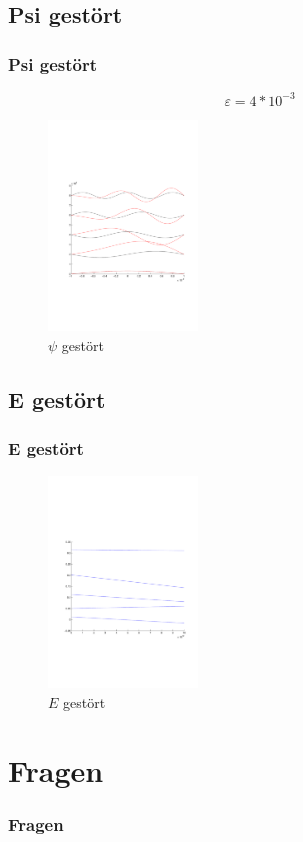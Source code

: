 \documentclass[aspectratio=169]{beamer}
\begin{document}
\subsection{ Psi gest\"ort }
\begin{frame}
  \frametitle{ Psi gest\"ort }
  \[
    \varepsilon = 4*10^{-3}
  \]
  \begin{figure}
    \centering
    \includegraphics[height=5.6cm,clip=true,trim=2cm 7cm 1cm 8cm]{../../skript/efeld/Psi_gestoert.pdf}
    \caption{$\psi$ gest\"ort}
    \label{abb:efeld_psi_gestoert}
  \end{figure}

\end{frame}

\subsection{ E gest\"ort }
\begin{frame}
  \frametitle{ E gest\"ort }
  \begin{figure}
    \centering
    \includegraphics[height=5.6cm,clip=true,trim=2cm 7cm 1cm 8cm]{../../skript/efeld/Energie_gestoert.pdf}
    \caption{$E$ gest\"ort}
    \label{abb:efeld_E_gestoert}
  \end{figure}

\end{frame}




\section{ Fragen }
\begin{frame}
  \frametitle{ Fragen }
\end{frame}
\end{document}
